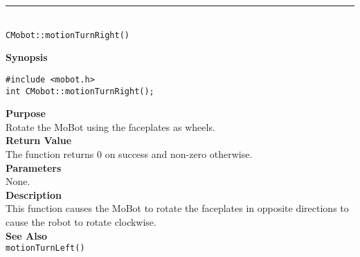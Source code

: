 \noindent
\vspace{5pt}
\rule{4.5in}{0.015in}\\
\noindent
{\LARGE \texttt{CMobot::motionTurnRight()}}\\
{}

\noindent
{\bf Synopsis}\\
\begin{verbatim}
#include <mobot.h>
int CMobot::motionTurnRight();
\end{verbatim}

\noindent
{\bf Purpose}\\
Rotate the MoBot using the faceplates as wheels.\\

\noindent
{\bf Return Value}\\
The function returns 0 on success and non-zero otherwise.\\

\noindent
{\bf Parameters}\\
None.\\

\noindent
{\bf Description}\\
This function causes the MoBot to rotate the faceplates in opposite directions
to cause the robot to rotate clockwise.\\

\noindent
{\bf See Also}\\
\texttt{motionTurnLeft()}

